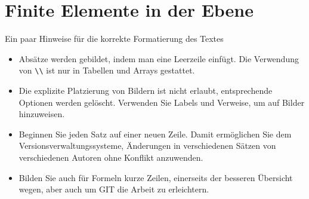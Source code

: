 %
%
%
\chapter{Finite Elemente in der Ebene\label{chapter:fem}}
\begin{refsection}

Ein paar Hinweise für die korrekte Formatierung des Textes
\begin{itemize}
\item
Absätze werden gebildet, indem man eine Leerzeile einfügt.
Die Verwendung von \verb+\\+ ist nur in Tabellen und Arrays gestattet.
\item
Die explizite Platzierung von Bildern ist nicht erlaubt, entsprechende
Optionen werden gelöscht. 
Verwenden Sie Labels und Verweise, um auf Bilder hinzuweisen.
\item
Beginnen Sie jeden Satz auf einer neuen Zeile. 
Damit ermöglichen Sie dem Versionsverwaltungssysteme, Änderungen
in verschiedenen Sätzen von verschiedenen Autoren ohne Konflikt 
anzuwenden.
\item 
Bilden Sie auch für Formeln kurze Zeilen, einerseits der besseren
Übersicht wegen, aber auch um GIT die Arbeit zu erleichtern.
\end{itemize}






\printbibliography[heading=subbibliography]
\end{refsection}
